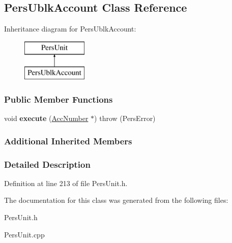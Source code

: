 \hypertarget{classPersUblkAccount}{\subsection{Pers\-Ublk\-Account Class Reference}
\label{d6/d3f/classPersUblkAccount}
}
Inheritance diagram for Pers\-Ublk\-Account\-:\begin{figure}[H]
\begin{center}
\leavevmode
\includegraphics[height=2.000000cm]{d6/d3f/classPersUblkAccount}
\end{center}
\end{figure}
\subsubsection*{Public Member Functions}
\begin{DoxyCompactItemize}
\item 
\hypertarget{classPersUblkAccount_a54c2da815d702cdb200c88cd802f7dd2}{void {\bfseries execute} (\hyperlink{classAccNumber}{Acc\-Number} $\ast$)  throw (\-Pers\-Error)}\label{d6/d3f/classPersUblkAccount_a54c2da815d702cdb200c88cd802f7dd2}

\end{DoxyCompactItemize}
\subsubsection*{Additional Inherited Members}


\subsubsection{Detailed Description}


Definition at line 213 of file Pers\-Unit.\-h.



The documentation for this class was generated from the following files\-:\begin{DoxyCompactItemize}
\item 
Pers\-Unit.\-h\item 
Pers\-Unit.\-cpp\end{DoxyCompactItemize}

